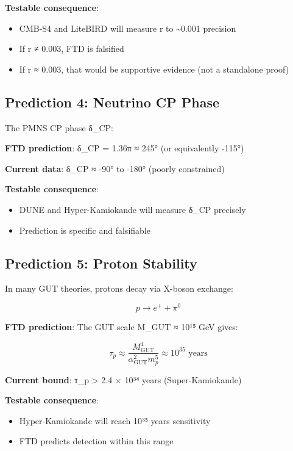 \documentclass[
  11pt,
  letterpaper,
  twoside,
  openany]{book}
\makeatletter
\providecommand{\tightlist}{%
  \setlength{\itemsep}{0pt}\setlength{\parskip}{0pt}}
\let\orig@subsection\subsection
\renewcommand{\subsection}{\needspace{6\baselineskip}\orig@subsection}
\makeatother
\begin{document}
\textbf{Testable consequence}:

\begin{itemize}
\tightlist
\item
  CMB-S4 and LiteBIRD will measure r to \textasciitilde0.001 precision
\item
  If r ≠ 0.003, FTD is falsified
\item
  If r ≈ 0.003, that would be supportive evidence (not a standalone
  proof)
\end{itemize}

\subsection{Prediction 4: Neutrino CP
Phase}\label{prediction-4-neutrino-cp-phase}

The PMNS CP phase δ\_CP:

\textbf{FTD prediction}: δ\_CP = 1.36π ≈ 245° (or equivalently -115°)

\textbf{Current data}: δ\_CP ≈ -90° to -180° (poorly constrained)

\textbf{Testable consequence}:

\begin{itemize}
\tightlist
\item
  DUNE and Hyper-Kamiokande will measure δ\_CP precisely
\item
  Prediction is specific and falsifiable
\end{itemize}

\subsection{Prediction 5: Proton
Stability}\label{prediction-5-proton-stability}

In many GUT theories, protons decay via X-boson exchange:

\[p \to e^+ + \pi^0\]

\textbf{FTD prediction}: The GUT scale M\_GUT ≈ 10¹⁵ GeV gives:

\[\tau_p \approx \frac{M_{\text{GUT}}^4}{\alpha_{\text{GUT}}^2 m_p^5} \approx 10^{35} \text{ years}\]

\textbf{Current bound}: τ\_p \textgreater{} 2.4 × 10³⁴ years
(Super-Kamiokande)

\textbf{Testable consequence}:

\begin{itemize}
\tightlist
\item
  Hyper-Kamiokande will reach 10³⁵ years sensitivity
\item
  FTD predicts detection within this range
\end{itemize}
\end{document}
